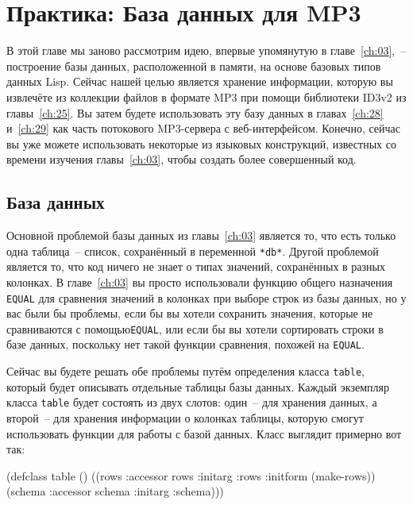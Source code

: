 \chapter{Практика: База данных для MP3}
\label{ch:27}

\thispagestyle{empty}

В этой главе мы заново рассмотрим идею, впервые упомянутую в главе~\ref{ch:03},~--
построение базы данных, расположенной в памяти, на основе базовых типов данных Lisp.
Сейчас нашей целью является хранение информации, которую вы извлечёте из коллекции файлов
в формате MP3 при помощи библиотеки ID3v2 из главы~\ref{ch:25}.  Вы затем будете
использовать эту базу данных в главах~\ref{ch:28} и~\ref{ch:29} как часть потокового
MP3-сервера с веб-интерфейсом.  Конечно, сейчас вы уже можете использовать некоторые из
языковых конструкций, известных со времени изучения главы~\ref{ch:03}, чтобы создать более
совершенный код.

\section{База данных}

Основной проблемой базы данных из главы~\ref{ch:03} является то, что есть только одна
таблица~-- список, сохранённый в переменной \lstinline{*db*}.  Другой проблемой является то,
что код ничего не знает о типах значений, сохранённых в разных колонках.  В
главе~\ref{ch:03} вы просто использовали функцию общего назначения \lstinline{EQUAL} для
сравнения значений в колонках при выборе строк из базы данных, но у вас были бы проблемы,
если бы вы хотели сохранить значения, которые не сравниваются с помощью\lstinline{EQUAL},
или если бы вы хотели сортировать строки в базе данных, поскольку нет такой функции
сравнения, похожей на \lstinline{EQUAL}.

Сейчас вы будете решать обе проблемы путём определения класса \lstinline{table}, который будет
описывать отдельные таблицы базы данных.  Каждый экземпляр класса \lstinline{table} будет
состоять из двух слотов: один~-- для хранения данных, а второй~-- для хранения информации о
колонках таблицы, которую смогут использовать функции для работы с базой данных.  Класс
выглядит примерно вот так:

\begin{myverb}
(defclass table ()
  ((rows   :accessor rows   :initarg :rows :initform (make-rows))
   (schema :accessor schema :initarg :schema)))
\end{myverb}


